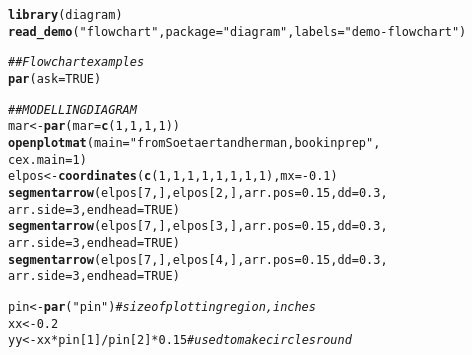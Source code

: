 \documentclass{article}\usepackage[]{graphicx}\usepackage[]{color}
\makeatletter
\newcommand{\hlnum}[1]{\textcolor[rgb]{0.686,0.059,0.569}{#1}}%
\newcommand{\hlstr}[1]{\textcolor[rgb]{0.192,0.494,0.8}{#1}}%
\newcommand{\hlcom}[1]{\textcolor[rgb]{0.678,0.584,0.686}{\textit{#1}}}%
\newcommand{\hlopt}[1]{\textcolor[rgb]{0,0,0}{#1}}%
\newcommand{\hlstd}[1]{\textcolor[rgb]{0.345,0.345,0.345}{#1}}%
\newcommand{\hlkwb}[1]{\textcolor[rgb]{0.69,0.353,0.396}{#1}}%
\newcommand{\hlkwc}[1]{\textcolor[rgb]{0.333,0.667,0.333}{#1}}%
\newcommand{\hlkwd}[1]{\textcolor[rgb]{0.737,0.353,0.396}{\textbf{#1}}}%
\newenvironment{kframe}{%
 \def\at@end@of@kframe{}%
 \ifinner\ifhmode%
  \def\at@end@of@kframe{\end{minipage}}%
  \begin{minipage}{\columnwidth}%
 \fi\fi%
 \def\FrameCommand##1{\hskip\@totalleftmargin \hskip-\fboxsep
 \colorbox{shadecolor}{##1}\hskip-\fboxsep
     \hskip-\linewidth \hskip-\@totalleftmargin \hskip\columnwidth}%
 \MakeFramed {\advance\hsize-\width
   \@totalleftmargin\z@ \linewidth\hsize
   \@setminipage}}%
 {\par\unskip\endMakeFramed%
 \at@end@of@kframe}
\newenvironment{knitrout}{}{} %
\makeatother
\begin{document}
\begin{knitrout}
\color{fgcolor}\begin{kframe}
\begin{alltt}
\hlkwd{library}\hlstd{(diagram)}
\hlkwd{read_demo}\hlstd{(}\hlstr{"flowchart"}\hlstd{,} \hlkwc{package} \hlstd{=} \hlstr{"diagram"}\hlstd{,} \hlkwc{labels} \hlstd{=} \hlstr{"demo-flowchart"}\hlstd{)}
\end{alltt}
\end{kframe}
\end{knitrout}
\begin{knitrout}
\color{fgcolor}\begin{kframe}
\begin{alltt}
\hlcom{## Flowchart examples}
\hlkwd{par}\hlstd{(}\hlkwc{ask} \hlstd{=} \hlnum{TRUE}\hlstd{)}

\hlcom{## MODELLING DIAGRAM}
\hlstd{mar} \hlkwb{<-} \hlkwd{par}\hlstd{(}\hlkwc{mar} \hlstd{=} \hlkwd{c}\hlstd{(}\hlnum{1}\hlstd{,} \hlnum{1}\hlstd{,} \hlnum{1}\hlstd{,} \hlnum{1}\hlstd{))}
\hlkwd{openplotmat}\hlstd{(}\hlkwc{main} \hlstd{=} \hlstr{"from Soetaert and herman, book in prep"}\hlstd{,}
    \hlkwc{cex.main} \hlstd{=} \hlnum{1}\hlstd{)}
\hlstd{elpos} \hlkwb{<-} \hlkwd{coordinates}\hlstd{(}\hlkwd{c}\hlstd{(}\hlnum{1}\hlstd{,} \hlnum{1}\hlstd{,} \hlnum{1}\hlstd{,} \hlnum{1}\hlstd{,} \hlnum{1}\hlstd{,} \hlnum{1}\hlstd{,} \hlnum{1}\hlstd{,} \hlnum{1}\hlstd{),} \hlkwc{mx} \hlstd{=} \hlopt{-}\hlnum{0.1}\hlstd{)}
\hlkwd{segmentarrow}\hlstd{(elpos[}\hlnum{7}\hlstd{, ], elpos[}\hlnum{2}\hlstd{, ],} \hlkwc{arr.pos} \hlstd{=} \hlnum{0.15}\hlstd{,} \hlkwc{dd} \hlstd{=} \hlnum{0.3}\hlstd{,}
    \hlkwc{arr.side} \hlstd{=} \hlnum{3}\hlstd{,} \hlkwc{endhead} \hlstd{=} \hlnum{TRUE}\hlstd{)}
\hlkwd{segmentarrow}\hlstd{(elpos[}\hlnum{7}\hlstd{, ], elpos[}\hlnum{3}\hlstd{, ],} \hlkwc{arr.pos} \hlstd{=} \hlnum{0.15}\hlstd{,} \hlkwc{dd} \hlstd{=} \hlnum{0.3}\hlstd{,}
    \hlkwc{arr.side} \hlstd{=} \hlnum{3}\hlstd{,} \hlkwc{endhead} \hlstd{=} \hlnum{TRUE}\hlstd{)}
\hlkwd{segmentarrow}\hlstd{(elpos[}\hlnum{7}\hlstd{, ], elpos[}\hlnum{4}\hlstd{, ],} \hlkwc{arr.pos} \hlstd{=} \hlnum{0.15}\hlstd{,} \hlkwc{dd} \hlstd{=} \hlnum{0.3}\hlstd{,}
    \hlkwc{arr.side} \hlstd{=} \hlnum{3}\hlstd{,} \hlkwc{endhead} \hlstd{=} \hlnum{TRUE}\hlstd{)}

\hlstd{pin} \hlkwb{<-} \hlkwd{par}\hlstd{(}\hlstr{"pin"}\hlstd{)}  \hlcom{# size of plotting region, inches}
\hlstd{xx} \hlkwb{<-} \hlnum{0.2}
\hlstd{yy} \hlkwb{<-} \hlstd{xx} \hlopt{*} \hlstd{pin[}\hlnum{1}\hlstd{]}\hlopt{/}\hlstd{pin[}\hlnum{2}\hlstd{]} \hlopt{*} \hlnum{0.15}  \hlcom{# used to make circles round}


\end{alltt}
\end{kframe}
\end{knitrout}
\end{document}

